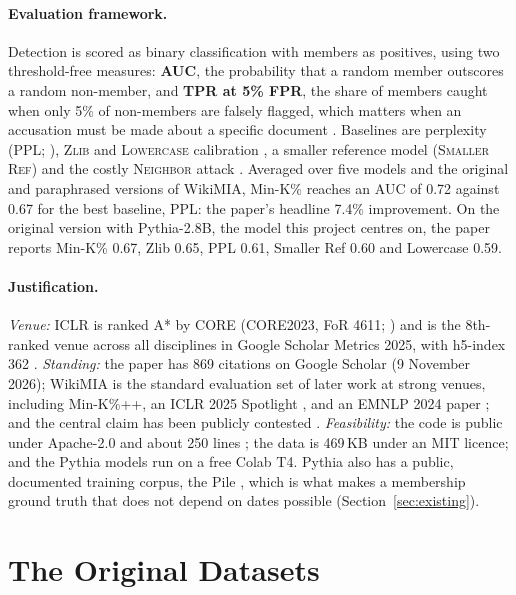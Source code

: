 \documentclass[11pt]{article}
\begin{document}
\paragraph{Evaluation framework.} Detection is scored as binary classification with members as positives, using two threshold-free measures: \textbf{AUC}, the probability that a random member outscores a random non-member, and \textbf{TPR at 5\% FPR}, the share of members caught when only 5\% of non-members are falsely flagged, which matters when an accusation must be made about a specific document \citep{carlini2022membership}. Baselines are perplexity (\textsc{PPL}; \citealp{yeom2018privacy}), \textsc{Zlib} and \textsc{Lowercase} calibration \citep{carlini2021extracting}, a smaller reference model (\textsc{Smaller Ref}) and the costly \textsc{Neighbor} attack \citep{mattern2023membership}. Averaged over five models and the original and paraphrased versions of WikiMIA, Min-K\% reaches an AUC of 0.72 against 0.67 for the best baseline, PPL: the paper's headline 7.4\% improvement. On the original version with Pythia-2.8B, the model this project centres on, the paper reports Min-K\% 0.67, Zlib 0.65, PPL 0.61, Smaller Ref 0.60 and Lowercase 0.59.

\paragraph{Justification.} \emph{Venue:} ICLR is ranked A* by CORE (CORE2023, FoR 4611; \citealp{core2023}) and is the 8th-ranked venue across all disciplines in Google Scholar Metrics 2025, with h5-index 362 \citep{scholarmetrics2025}. \emph{Standing:} the paper has 869 citations on Google Scholar (9 November 2026); WikiMIA is the standard evaluation set of later work at strong venues, including Min-K\%++, an ICLR 2025 Spotlight \citep{zhang2025minkpp}, and an EMNLP 2024 paper \citep{zhang2024pretraining}; and the central claim has been publicly contested \citep{duan2024membership,das2024blind}. \emph{Feasibility:} the code is public under Apache-2.0 and about 250 lines \citep{minkcode2023}; the data is 469\,KB under an MIT licence; and the Pythia models \citep{biderman2023pythia} run on a free Colab T4. Pythia also has a public, documented training corpus, the Pile \citep{gao2020pile}, which is what makes a membership ground truth that does not depend on dates possible (Section~\ref{sec:existing}).

\section{The Original Datasets}
\label{sec:wikimia}
\end{document}
